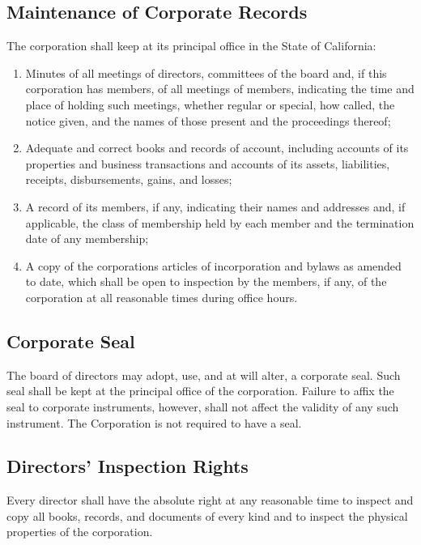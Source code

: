 \documentclass{article}
\begin{document}
	\subsection{Maintenance of Corporate Records}
	The corporation shall keep at its principal office in the State of California:
	\begin{enumerate}[\indent (a)]
		\item Minutes of all meetings of directors, committees of the board and, if this corporation has members, of all meetings of members, indicating the time and place of holding such meetings, whether regular or special, how called, the notice given, and the names of those present and the proceedings thereof;
		\item Adequate and correct books and records of account, including accounts of its properties and business transactions and accounts of its assets, liabilities, receipts, disbursements, gains, and losses;
		\item A record of its members, if any, indicating their names and addresses and, if applicable, the class of membership held by each member and the termination date of any membership;
		\item A copy of the corporation\textquotesingle s articles of incorporation and bylaws as amended to date, which shall be open to inspection by the members, if any, of the corporation at all reasonable times during office hours.
	\end{enumerate}
	\subsection{Corporate Seal}
	The board of directors may adopt, use, and at will alter, a corporate seal. Such seal shall be kept at the principal office of the corporation. Failure to affix the seal to corporate instruments, however, shall not affect the validity of any such instrument. The Corporation is not required to have a seal.
	\subsection{Directors' Inspection Rights}
	Every director shall have the absolute right at any reasonable time to inspect and copy all books, records, and documents of every kind and to inspect the physical properties of the corporation.
\end{document}
